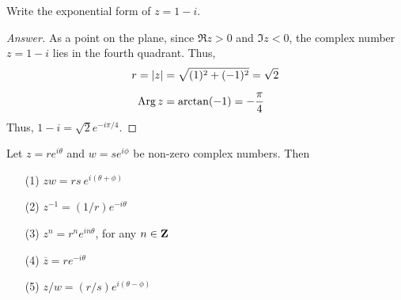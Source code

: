 \medskip

\begin{example}[in-class]
Write the exponential form of $z = 1 - i$.
\end{example}
\begin{proof}[Answer]
As a point on the plane, since $\Re z > 0$ and $\Im z < 0$, the complex number $z = 1 - i$ lies in the fourth quadrant. Thus, 
\begin{align*}
r = \left\lvert z\right\rvert &= \sqrt{(1)^2 + (-1)^2} = \sqrt{2}\\[0.5em]
\operatorname{Arg} z &= \arctan(-1) = -\frac{\pi}{4}
\end{align*}
Thus, $1 - i = \sqrt{2}e^{-i \pi/4}$. 
\end{proof}

\medskip

\begin{proposition}\label{propeuler}
Let $z = re^{i\theta}$ and $w = se^{i\phi}$ be non-zero complex numbers. Then
\begin{itemize}
\item[(1)] $zw = rs\  e^{i(\theta + \phi)}$
\item[(2)] $z^{-1} = (1/r) e^{-i\theta}$
\item[(3)] $z^n = r^n e^{in\theta}$, for any $n \in \mathbf Z$
\item[(4)] $\overline{z} = re^{-i\theta}$
\item[(5)] $z/w = (r/s)e^{i(\theta - \phi)}$
\end{itemize}
\end{proposition}
